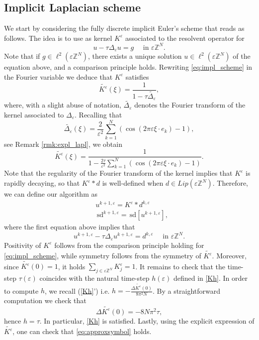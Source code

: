 \documentclass[10pt]{amsart}
\theoremstyle{plain}
\theoremstyle{definition}
\newcommand{\Z}{\mathbb{Z}}
\newcommand{\e}{\varepsilon}
\newcommand{\sd}{\,\mathrm{sd}}
\newcommand{\ez}{\e\Z^N}
\numberwithin{equation}{section}
\begin{document}
\subsection*{Implicit Laplacian scheme}
We start by considering the fully discrete implicit Euler's scheme that reads as follows. The idea is to use as kernel $K^\e$ 
associated to the resolvent operator for 
\begin{equation}\label{eq:impl_scheme}
    u - \tau\Delta_\e u=g\quad \text{ in }\ez.
\end{equation}
Note that if $g\in\ell^2(\ez)$, there exists a unique solution $u\in\ell^2(\ez)$ of the equation above, and a comparison principle holds. 
Rewriting \eqref{eq:impl_scheme} in the Fourier variable we deduce that  $K^\e$ satisfies
\[
    \widetilde{K^\e}(\xi)=\frac1{1-\tau\widetilde{\Delta_\e}},
\]
where, with a slight abuse of notation, $\widetilde{\Delta_\e}$ denotes the Fourier transform of the kernel associated to $\Delta_\e$.
Recalling that
\begin{equation}\label{eq:ker_Delta}
    \widetilde{\Delta_\e}(\xi)=\frac{2}{\e^2}\sum_{k=1}^N (\cos(2\pi\e  \xi\cdot e_k)-1),
\end{equation}
see  Remark \ref{rmk:expl_lapl}, we obtain
\[
    \widetilde{K^\e}(\xi)=\frac1{1-\frac{2\tau}{\e^2}\sum_{k=1}^N (\cos(2\pi\e  \xi\cdot e_k)-1)}.
\]
Note that the regularity of the Fourier transform of the kernel implies that $K^\e$ is rapidly decaying, so that $K^\e\ast d$ is well-defined when $d\in Lip(\ez)$.
Therefore, we can define our algorithm as 
\begin{equation*}
    \begin{split}
    &u^{k+1,\e} = K^\e\ast d^{k,\e}\\
    &\sd^{k+1,\e}=\sd[u^{k+1,\e} ],
\end{split}
\end{equation*}
where the first equation above implies that
\[
     u^{k+1,\e} - \tau\Delta_\e u^{k+1,\e}=d^{k,\e}\quad \text{ in }\ez.
\]
Positivity of $K^\e$ follows from the comparison principle holding for   \eqref{eq:impl_scheme},  while symmetry follows from the symmetry of $\widetilde{K^\e}$. Moreover, since  $\widetilde{K^\e}(0)=1$, it holds $\sum_{j\in\ez} K^\e_j=1$. It remains to check that the time-step $\tau(\e)$ coincides with the natural time-step $h(\e)$ defined in \eqref{Kh}.
In order to compute $h$, we recall (\ref{Kh}') i.e. $h=-\frac{\Delta \widetilde{K^\e}(0)}{8\pi^2 N}$. By a straightforward computation we check that 
\[
    \Delta \widetilde{K^\e}(0)=-8N\pi^2\tau,
\]
hence $h=\tau$. In particular, \eqref{Kh} is satisfied. Lastly, using the explicit expression of $\widetilde{K^\e}$, one can check that \eqref{eq:approxsymbol}  holds.
\end{document}
